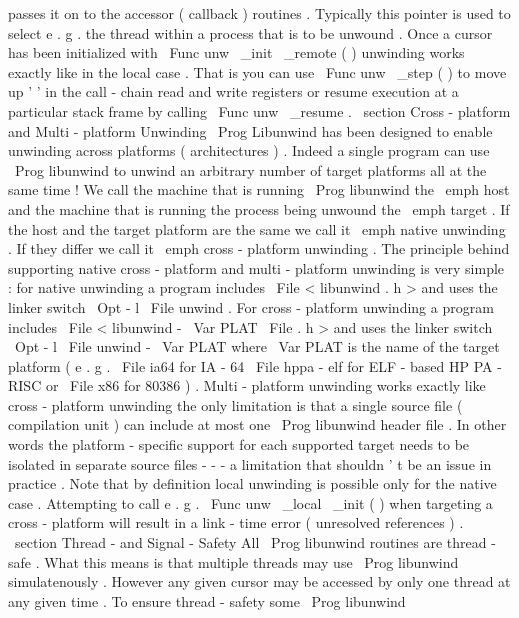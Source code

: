 passes
it
on
to
the
accessor
(
callback
)
routines
.
Typically
this
pointer
is
used
to
select
e
.
g
.
the
thread
within
a
process
that
is
to
be
unwound
.
Once
a
cursor
has
been
initialized
with
\
Func
{
unw
\
_init
\
_remote
}
(
)
unwinding
works
exactly
like
in
the
local
case
.
That
is
you
can
use
\
Func
{
unw
\
_step
}
(
)
to
move
up
'
'
in
the
call
-
chain
read
and
write
registers
or
resume
execution
at
a
particular
stack
frame
by
calling
\
Func
{
unw
\
_resume
}
.
\
section
{
Cross
-
platform
and
Multi
-
platform
Unwinding
}
\
Prog
{
Libunwind
}
has
been
designed
to
enable
unwinding
across
platforms
(
architectures
)
.
Indeed
a
single
program
can
use
\
Prog
{
libunwind
}
to
unwind
an
arbitrary
number
of
target
platforms
all
at
the
same
time
!
We
call
the
machine
that
is
running
\
Prog
{
libunwind
}
the
\
emph
{
host
}
and
the
machine
that
is
running
the
process
being
unwound
the
\
emph
{
target
}
.
If
the
host
and
the
target
platform
are
the
same
we
call
it
\
emph
{
native
}
unwinding
.
If
they
differ
we
call
it
\
emph
{
cross
-
platform
}
unwinding
.
The
principle
behind
supporting
native
cross
-
platform
and
multi
-
platform
unwinding
is
very
simple
:
for
native
unwinding
a
program
includes
\
File
{
<
libunwind
.
h
>
}
and
uses
the
linker
switch
\
Opt
{
-
l
}
\
File
{
unwind
}
.
For
cross
-
platform
unwinding
a
program
includes
\
File
{
<
libunwind
-
}
\
Var
{
PLAT
}
\
File
{
.
h
>
}
and
uses
the
linker
switch
\
Opt
{
-
l
}
\
File
{
unwind
-
}
\
Var
{
PLAT
}
where
\
Var
{
PLAT
}
is
the
name
of
the
target
platform
(
e
.
g
.
\
File
{
ia64
}
for
IA
-
64
\
File
{
hppa
-
elf
}
for
ELF
-
based
HP
PA
-
RISC
or
\
File
{
x86
}
for
80386
)
.
Multi
-
platform
unwinding
works
exactly
like
cross
-
platform
unwinding
the
only
limitation
is
that
a
single
source
file
(
compilation
unit
)
can
include
at
most
one
\
Prog
{
libunwind
}
header
file
.
In
other
words
the
platform
-
specific
support
for
each
supported
target
needs
to
be
isolated
in
separate
source
files
-
-
-
a
limitation
that
shouldn
'
t
be
an
issue
in
practice
.
Note
that
by
definition
local
unwinding
is
possible
only
for
the
native
case
.
Attempting
to
call
e
.
g
.
\
Func
{
unw
\
_local
\
_init
}
(
)
when
targeting
a
cross
-
platform
will
result
in
a
link
-
time
error
(
unresolved
references
)
.
\
section
{
Thread
-
and
Signal
-
Safety
}
All
\
Prog
{
libunwind
}
routines
are
thread
-
safe
.
What
this
means
is
that
multiple
threads
may
use
\
Prog
{
libunwind
}
simulatenously
.
However
any
given
cursor
may
be
accessed
by
only
one
thread
at
any
given
time
.
To
ensure
thread
-
safety
some
\
Prog
{
libunwind
}
